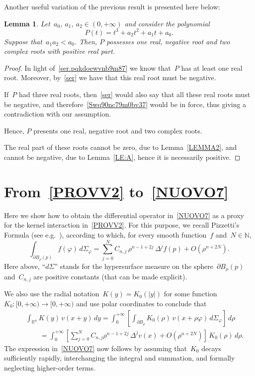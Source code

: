 \documentclass[12pt]{amsart}
\newcommand{\R}{\mathbb{R}}
\newcommand{\N}{\mathbb{N}}
\numberwithin{equation}{section}
\newtheorem{lemma}[theorem]{Lemma}
\begin{document}
\begin{appendix}
Another useful variation of the previous result is presented here below:

\begin{lemma}\label{APK0-2CMAswqpr}
Let~$a_0$, $a_1$, $a_2\in(0,+\infty)$ and consider the polynomial $$P(t) = t^3 + a_2 t^2 + a_1 t + a_0.$$ 
Suppose that~$a_1 a_2 < a_0 $.
Then, $P$ possesses one real, negative root and two complex roots with positive real part.
\end{lemma}

\begin{proof} In light of~\eqref{ser.pqkdoewvnb9m87} we know that~$P$ has at least one real root.
Moreover, by~\eqref{ser} we have that this real root must be negative.

If~$P$ had three real roots, then~\eqref{ser} would also say that all these real roots must be negative, and therefore~\eqref{Swq90nc79m0bv37} would be in force, thus giving a contradiction with our assumption.

Hence, $P$ presents one real, negative root and two complex roots.

The real part of these roots cannot be zero, due to Lemma~\ref{LEMMA2},
and cannot be negative, due to Lemma~\ref{LE:A}, hence it is necessarily positive.
\end{proof}

\section{{F}rom~\eqref{PROVV2} to~\eqref{NUOVO7}}\label{0apjclrgh}

Here we show how to obtain the differential operator in~\eqref{NUOVO7} as a proxy
for the kernel interaction in~\eqref{PROVV2}. For this purpose, we recall Pizzetti's Formula
(see e.g.~\cite[equation~(1.1.16)]{DV24BK}), according to which, for every smooth function~$f$ and~$N\in\N$,
$$\int_{\partial B_\rho(p)} f(\varphi)\,d\Sigma_\varphi=\sum_{j=0}^N C_{n,j} \,\rho^{n-1+2j}\,\Delta^j f(p)+O(\rho^{n+2N}).$$
Here above, ``$d\Sigma$'' stands for the hypersurface measure on the sphere~$\partial B_\rho(p)$ and~$C_{n,j}$
are positive constants (that can be made explicit). 

We also use the radial notation~$K(y)=K_0(|y|)$ for some function~$K_0:[0,+\infty)\to[0,+\infty)$
and use polar coordinates to conclude that
\begin{eqnarray*}
&& \int_{\R^n} K(y)\,v(x+y)\,dy=\int_0^{+\infty}\left[
\int_{\partial B_\rho} K_0(\rho)\,v(x+\rho\varphi)\,d\Sigma_\varphi\right]\,d\rho\\&&\qquad=\int_0^{+\infty}\left[ 
\sum_{j=0}^N C_{n,j} \rho^{n-1+2j}\,\Delta^j v(x)+O(\rho^{n+2N})
\right]\,K_0(\rho)\,d\rho.
\end{eqnarray*}The expression in~\eqref{NUOVO7} now
follows by assuming that~$K_0$ decays sufficiently rapidly, interchanging the integral and summation, and formally neglecting higher-order terms.

\end{appendix}
\end{document}
